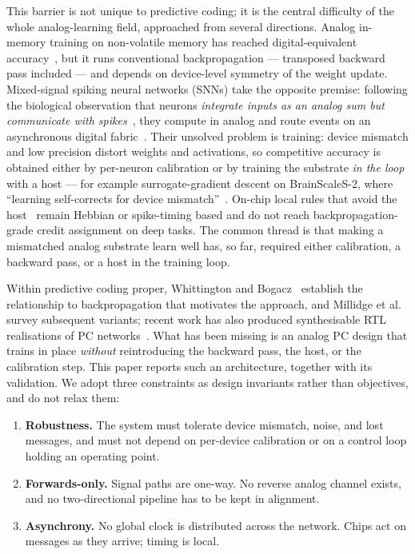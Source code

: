 \documentclass[11pt]{article}
\begin{document}
This barrier is not unique to predictive coding; it is the central difficulty of the whole
analog-learning field, approached from several directions. Analog in-memory training on non-volatile
memory has reached digital-equivalent accuracy~\cite{ambrogio2018equivalent}, but it runs
conventional backpropagation --- transposed backward pass included --- and depends on device-level
symmetry of the weight update. Mixed-signal spiking neural networks (SNNs) take the opposite premise:
following the biological observation that neurons \emph{integrate inputs as an analog sum but
communicate with spikes}~\cite{cramer2022surrogate}, they compute in analog and route events on an
asynchronous digital fabric~\cite{chicca2014neuromorphic,benjamin2014neurogrid,moradi2018dynap}.
Their unsolved problem is training: device mismatch and low precision distort weights and
activations, so competitive accuracy is obtained either by per-neuron calibration or by training the
substrate \emph{in the loop} with a host --- for example surrogate-gradient descent on BrainScaleS-2,
where ``learning self-corrects for device mismatch''~\cite{cramer2022surrogate}. On-chip local rules
that avoid the host~\cite{rubino2023neuromorphic,davies2018loihi} remain Hebbian or spike-timing
based and do not reach backpropagation-grade credit assignment on deep tasks. The common thread is
that making a mismatched analog substrate learn well has, so far, required either calibration, a
backward pass, or a host in the training loop.

Within predictive coding proper, Whittington and Bogacz~\cite{whittington2017approximation} establish
the relationship to backpropagation that motivates the approach, and Millidge et
al.~\cite{millidge2022predictive} survey subsequent variants; recent work has also produced
synthesisable RTL realisations of PC networks~\cite{oh2026synthesizable}. What has been missing is an
analog PC design that trains in place \emph{without} reintroducing the backward pass, the host, or the
calibration step. This paper reports such an architecture, together with its validation. We adopt
three constraints as design invariants rather than objectives, and do not relax them:

\begin{enumerate}
\item \textbf{Robustness.} The system must tolerate device mismatch, noise, and lost messages, and
must not depend on per-device calibration or on a control loop holding an operating point.
\item \textbf{Forwards-only.} Signal paths are one-way. No reverse analog channel exists, and no
two-directional pipeline has to be kept in alignment.
\item \textbf{Asynchrony.} No global clock is distributed across the network. Chips act on messages
as they arrive; timing is local.
\end{enumerate}
\end{document}
